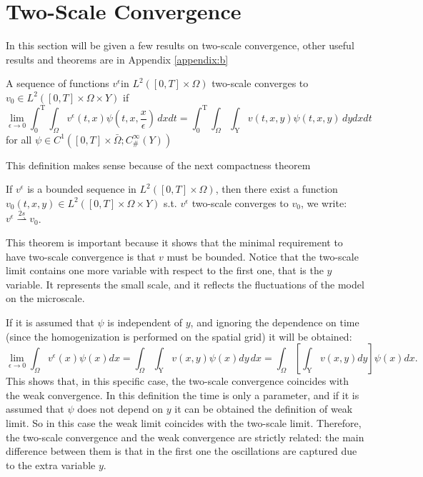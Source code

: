 \section{Two-Scale Convergence}
In this section will be given a few results on two-scale convergence, other useful results and theorems are in Appendix \ref{appendix:b}
\begin{definition}
A sequence of functions $ v ^ {\epsilon } $in $ L^2([ 0 ,T]\times\Omega) $ two-scale converges to $v_{0} \in L^2([ 0 ,T]\times\Omega \times Y)$ if
$$
\lim_{\epsilon \to 0} \int_{0}^{\textrm{T}} \int_{\Omega} v^{\epsilon}(t,x)\psi\left(t,x,\frac{x}{\epsilon}\right) \, dxdt=\int_{0}^{\textrm{T}} \int_{\Omega} \int_{\textrm{Y}} v(t,x,y)\psi(t,x,y) \, dydxdt
$$ 
for all $\psi \in C^1([0,T]\times \bar\Omega;C_{\#}^{\infty}(Y))$
\label{def 7.1}\end{definition}
This definition makes sense because of the next compactness theorem 
\begin{theorem}
If $v^{\epsilon}$ is a bounded sequence in $ L^2([ 0 ,T]\times\Omega) $, then there exist a function $v_{0}(t,x,y) \in   L^2([0,T]\times\Omega \times Y)$ s.t. $v^{\epsilon}$ two-scale converges to $v_{0}$, we write: 
$v^{\epsilon} \overset{2s}{\rightharpoonup} v_{0}$.
\label{thm 7.1}\end{theorem}
This theorem is important because it shows that the minimal requirement to have two-scale convergence is that $v$ must be bounded. Notice that the two-scale limit contains one more variable with respect to the first one, that is the $y$ variable. It represents the small scale, and it reflects the fluctuations of the model on the microscale.
\begin{remark} If it is assumed that $\psi$ is independent of $y$, and ignoring the dependence on time (since the homogenization is performed on the spatial grid) it will be obtained:
$$ 
\lim_{\epsilon \to 0} \int_{\Omega} v^{\epsilon}(x)\psi(x)dx= \int_{\Omega} \int_{\textrm{Y}} v(x,y)\psi(x)dy \, dx=\int_{\Omega} \left[\int_{\textrm{Y}} v(x,y)dy\right]\psi(x)dx.
$$This shows that, in this specific case, the two-scale convergence coincides with the weak convergence.
In this definition the time is only a parameter, and if it is assumed that $\psi$ does not depend on $y$ it can be obtained the definition of weak limit. So in this case the weak limit coincides with the two-scale limit. Therefore, the two-scale convergence and the weak convergence are strictly related: the main difference between them is that in the first one the oscillations are captured due to the extra variable $y$.
\end{remark}
